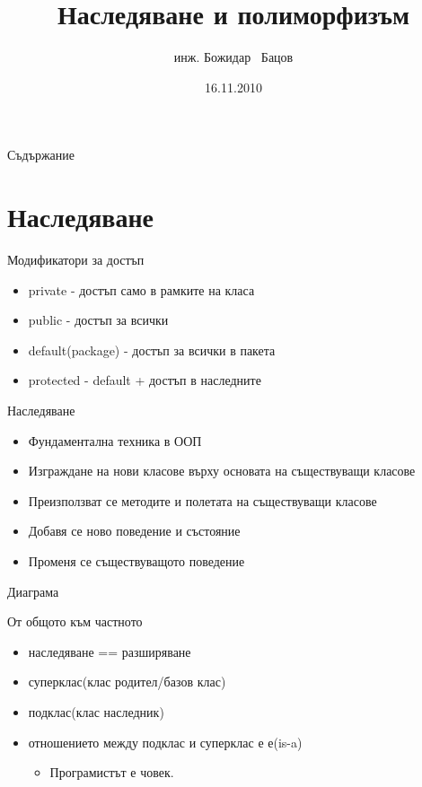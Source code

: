 \documentclass{beamer}
\title{Наследяване и полиморфизъм}
\author{инж. Божидар ~Бацов}
\institute{Drow Ltd.}
\date{16.11.2010}
\begin{document}
\begin{frame}
  \titlepage
\end{frame}

\begin{frame}{Съдържание}
  \tableofcontents[pausesections]
\end{frame}

\section{Наследяване}

\begin{frame}{Модификатори за достъп}
  \begin{itemize}
  \item private - достъп само в рамките на класа
  \item public - достъп за всички
  \item default(package) - достъп за всички в пакета
  \item protected - default + достъп в наследните
  \end{itemize}
\end{frame}

\begin{frame}{Наследяване}
  \transdissolve
  \begin{itemize}
  \item Фундаментална техника в ООП
  \item Изграждане на нови класове върху основата на съществуващи
    класове
  \item Преизползват се методите и полетата на съществуващи класове
  \item Добавя се ново поведение и състояние
  \item Променя се съществуващото поведение
  \end{itemize}
\end{frame}


\begin{frame}{Диаграма}
  \transdissolve
  
\end{frame}

\begin{frame}{От общото към частното}
  \transdissolve
  \begin{itemize}
  \item наследяване == разширяване
  \item суперклас(клас родител/базов клас)
  \item подклас(клас наследник)
  \item отношението между подклас и суперклас е е(is-a)
    \begin{itemize}
      \item Програмистът е човек.
    \end{itemize}

  \end{itemize}
\end{frame}
\end{document}
